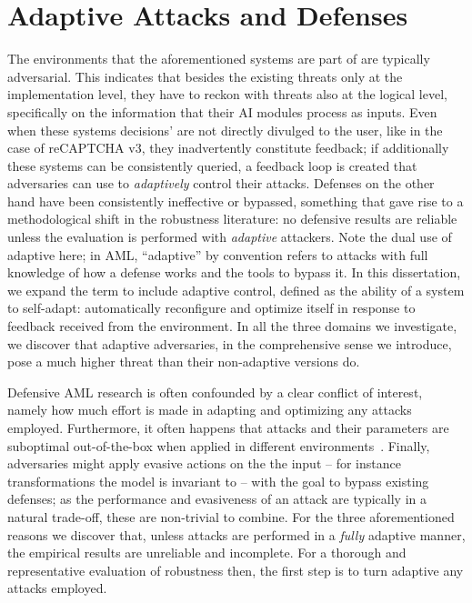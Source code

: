 \section{Adaptive Attacks and Defenses}

The environments that the aforementioned systems are part of are typically adversarial.
This indicates that besides the existing threats only at the implementation level, they have to reckon with threats also at the logical level, specifically on the information that their \gls{AI} modules process as inputs.
Even when these systems decisions' are not directly divulged to the user, like in the case of reCAPTCHA v3, they inadvertently constitute feedback; if additionally these systems can be consistently queried, a feedback loop is created that adversaries can use to \textit{adaptively} control their attacks.
Defenses on the other hand have been consistently ineffective or bypassed, something that gave rise to a methodological shift in the robustness literature: no defensive results are reliable unless the evaluation is performed with \textit{adaptive} attackers.
Note the dual use of adaptive here; in \gls{AML}, “adaptive” by convention refers to attacks with full knowledge of how a defense works and the tools to bypass it.
In this dissertation, we expand the term to include adaptive control, defined as the ability of a system to self-adapt: automatically reconfigure and optimize itself in response to feedback received from the environment.
In all the three domains we investigate, we discover that adaptive adversaries, in the comprehensive sense we introduce, pose a much higher threat than their non-adaptive versions do.

Defensive \gls{AML} research is often confounded by a clear conflict of interest, namely how much effort is made in adapting and optimizing any attacks employed.
Furthermore, it often happens that attacks and their parameters are suboptimal out-of-the-box when applied in different environments~\cite{croce2020reliable}.
Finally, adversaries might apply evasive actions on the the input -- for instance transformations the model is invariant to -- with the goal to bypass existing defenses; as the performance and evasiveness of an attack are typically in a natural trade-off, these are non-trivial to combine.
For the three aforementioned reasons we discover that, unless attacks are performed in a \textit{fully} adaptive manner, the empirical results are unreliable and incomplete.
For a thorough and representative evaluation of robustness then, the first step is to turn adaptive any attacks employed.


